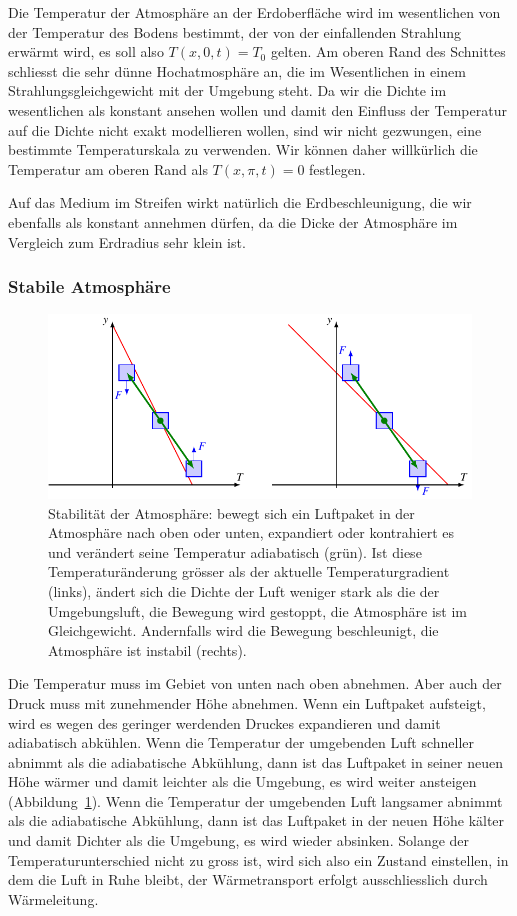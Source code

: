 Die Temperatur der Atmosphäre an der Erdoberfläche wird im wesentlichen von
der Temperatur des Bodens bestimmt, der von der einfallenden Strahlung
erwärmt wird, es soll also $T(x,0,t)=T_0$ gelten.
Am oberen Rand des Schnittes schliesst die sehr dünne Hochatmosphäre an,
die im Wesentlichen in einem Strahlungsgleichgewicht mit der Umgebung steht.
Da wir die Dichte im wesentlichen als konstant ansehen wollen und damit
den Einfluss der Temperatur auf die Dichte nicht exakt modellieren wollen,
sind wir nicht gezwungen, eine bestimmte Temperaturskala zu verwenden.
Wir können daher willkürlich die Temperatur am oberen Rand als
$T(x,\pi,t)=0$ festlegen.

Auf das Medium im Streifen wirkt natürlich die Erdbeschleunigung,
die wir ebenfalls als konstant annehmen dürfen, da die Dicke der 
Atmosphäre im Vergleich zum Erdradius sehr klein ist.

\subsubsection{Stabile Atmosphäre}
\begin{figure}
\centering
\includegraphics{chapters/2/lorenz-stabil.pdf}
\caption{Stabilität der Atmosphäre: bewegt sich ein Luftpaket in der
Atmosphäre nach oben oder unten, expandiert oder kontrahiert es und
verändert seine Temperatur adiabatisch (grün).
Ist diese Temperaturänderung grösser als der aktuelle Temperaturgradient
(links),
ändert sich die Dichte der Luft weniger stark als die der Umgebungsluft,
die Bewegung wird gestoppt, die Atmosphäre ist im Gleichgewicht.
Andernfalls wird die Bewegung beschleunigt, die Atmosphäre ist instabil
(rechts).
\label{skript:stabilitaet der atmosphaere}}
\end{figure}
Die Temperatur muss im Gebiet von unten nach oben abnehmen.
Aber auch der Druck muss mit zunehmender Höhe abnehmen. 
Wenn ein Luftpaket aufsteigt, wird es wegen des geringer werdenden
Druckes expandieren und damit adiabatisch abkühlen.
Wenn die Temperatur der umgebenden Luft schneller abnimmt als die
adiabatische Abkühlung, dann ist das Luftpaket in seiner neuen Höhe
wärmer und damit leichter als die Umgebung, es wird weiter ansteigen
(Abbildung~\ref{skript:stabilitaet der atmosphaere}).
Wenn die Temperatur der umgebenden Luft langsamer abnimmt als die
adiabatische Abkühlung, dann ist das Luftpaket in der neuen Höhe 
kälter und damit Dichter als die Umgebung, es wird wieder absinken.
Solange der Temperaturunterschied nicht zu gross ist, wird sich also ein
Zustand einstellen, in dem die Luft in Ruhe bleibt, der Wärmetransport
erfolgt ausschliesslich durch Wärmeleitung.

